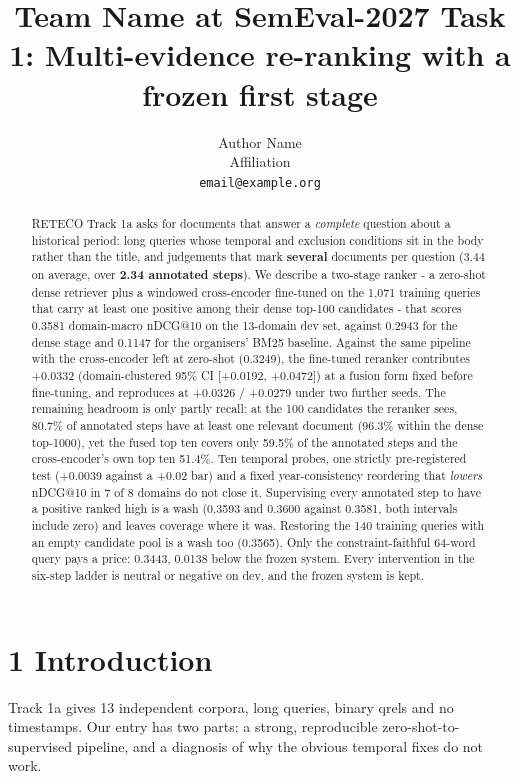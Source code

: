 \documentclass[11pt]{article}
\title{Team Name at SemEval-2027 Task 1: Multi-evidence re-ranking with a frozen first stage}
\author{Author Name \\ Affiliation \\ \texttt{email@example.org}}
\date{}
\begin{document}
\maketitle
\begin{abstract}
RETECO Track 1a asks for documents that answer a \emph{complete} question about a historical period: long queries whose temporal and exclusion conditions sit in the body rather than the title, and judgements that mark \textbf{several} documents per question (3.44 on average, over \textbf{2.34 annotated steps}). We describe a two-stage ranker - a zero-shot dense retriever plus a windowed cross-encoder fine-tuned on the 1,071 training queries that carry at least one positive among their dense top-100 candidates - that scores 0.3581 domain-macro nDCG@10 on the 13-domain dev set, against 0.2943 for the dense stage and 0.1147 for the organisers’ BM25 baseline. Against the same pipeline with the cross-encoder left at zero-shot (0.3249), the fine-tuned reranker contributes +0.0332 (domain-clustered 95\% CI [+0.0192, +0.0472]) at a fusion form fixed before fine-tuning, and reproduces at +0.0326 / +0.0279 under two further seeds. The remaining headroom is only partly recall: at the 100 candidates the reranker sees, 80.7\% of annotated steps have at least one relevant document (96.3\% within the dense top-1000), yet the fused top ten covers only 59.5\% of the annotated steps and the cross-encoder’s own top ten 51.4\%. Ten temporal probes, one strictly pre-registered test (+0.0039 against a +0.02 bar) and a fixed year-consistency reordering that \emph{lowers} nDCG@10 in 7 of 8 domains do not close it. Supervising every annotated step to have a positive ranked high is a wash (0.3593 and 0.3600 against 0.3581, both intervals include zero) and leaves coverage where it was. Restoring the 140 training queries with an empty candidate pool is a wash too (0.3565). Only the constraint-faithful 64-word query pays a price: 0.3443, 0.0138 below the frozen system. Every intervention in the six-step ladder is neutral or negative on dev, and the frozen system is kept.

\end{abstract}
\section*{1 Introduction}
Track 1a gives 13 independent corpora, long queries, binary qrels and no timestamps. Our entry has two parts: a strong, reproducible zero-shot-to-supervised pipeline, and a diagnosis of why the obvious temporal fixes do not work.
\end{document}
